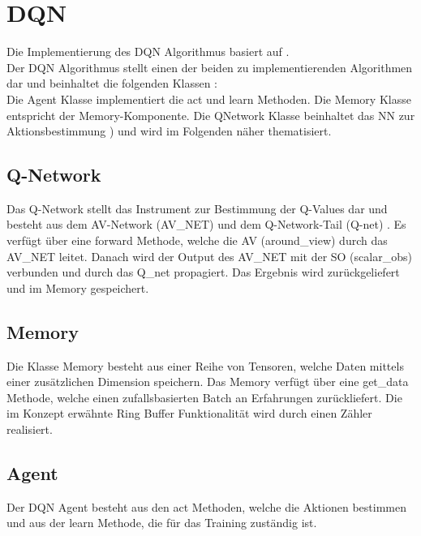 \section{DQN} \label{sec:Implementierung_DQN}
Die Implementierung des DQN Algorithmus basiert auf \cite{Charles2013}.\\
Der DQN Algorithmus stellt einen der beiden zu implementierenden Algorithmen dar und beinhaltet die folgenden Klassen :\\
Die Agent Klasse implementiert die act  und learn  Methoden.
Die Memory Klasse entspricht der Memory-Komponente. Die QNetwork Klasse beinhaltet das NN zur Aktionsbestimmung ) und wird im Folgenden näher thematisiert.

\subsection{Q-Network} \label{subsec:Implementierung_Q-Network}
Das Q-Network stellt das Instrument zur Bestimmung der Q-Values dar und besteht aus dem AV-Network (AV\_NET) und dem Q-Network-Tail (Q-net) . Es verfügt über eine
forward Methode, welche die AV (around\_view) durch das AV\_NET leitet. Danach wird der Output des AV\_NET mit der SO (scalar\_obs) verbunden und durch das Q\_net propagiert. Das Ergebnis wird zurückgeliefert und im Memory gespeichert. 

\subsection{Memory} \label{subsec:Implementierung_Memory_DQN}
Die Klasse Memory besteht aus einer Reihe von Tensoren, welche Daten mittels einer zusätzlichen Dimension speichern.
Das Memory verfügt über eine get\_data Methode, welche einen zufallsbasierten Batch an Erfahrungen zurückliefert. Die im Konzept erwähnte Ring Buffer Funktionalität wird durch einen Zähler realisiert. 

\subsection{Agent} \label{subsec:Implementierung_DQN_Agent}
Der DQN Agent besteht aus den act Methoden, welche die Aktionen bestimmen und aus der learn Methode, die für das Training zuständig ist.

